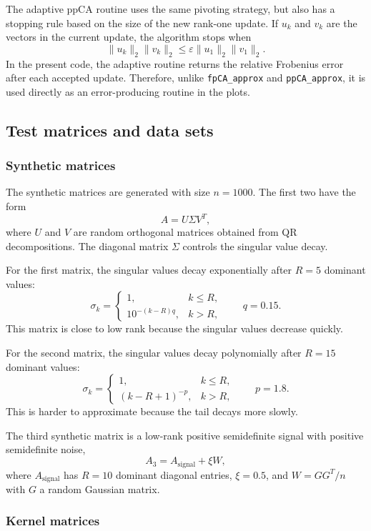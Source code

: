 The adaptive ppCA routine uses the same pivoting strategy, but also has a stopping rule based on the size of the new rank-one update. If $u_k$ and $v_k$ are the vectors in the current update, the algorithm stops when
\[
  \|u_k\|_2 \|v_k\|_2
  \leq
  \varepsilon \|u_1\|_2 \|v_1\|_2 .
\]
In the present code, the adaptive routine returns the relative Frobenius error after each accepted update. Therefore, unlike \texttt{fpCA\_approx} and \texttt{ppCA\_approx}, it is used directly as an error-producing routine in the plots.

\subsection{Test matrices and data sets}

\subsubsection*{Synthetic matrices}

The synthetic matrices are generated with size $n=1000$. The first two have the form
\[
  A = U \Sigma V^T,
\]
where $U$ and $V$ are random orthogonal matrices obtained from QR decompositions. The diagonal matrix $\Sigma$ controls the singular value decay.

For the first matrix, the singular values decay exponentially after $R=5$ dominant values:
\[
  \sigma_k =
  \begin{cases}
    1, & k \leq R, \\
    10^{-(k-R)q}, & k > R,
  \end{cases}
  \qquad q = 0.15 .
\]
This matrix is close to low rank because the singular values decrease quickly.

For the second matrix, the singular values decay polynomially after $R=15$ dominant values:
\[
  \sigma_k =
  \begin{cases}
    1, & k \leq R, \\
    (k-R+1)^{-p}, & k > R,
  \end{cases}
  \qquad p = 1.8 .
\]
This is harder to approximate because the tail decays more slowly.

The third synthetic matrix is a low-rank positive semidefinite signal with positive semidefinite noise,
\[
  A_3 = A_{\mathrm{signal}} + \xi W,
\]
where $A_{\mathrm{signal}}$ has $R=10$ dominant diagonal entries, $\xi=0.5$, and $W = GG^T/n$ with $G$ a random Gaussian matrix.

\subsubsection*{Kernel matrices}

